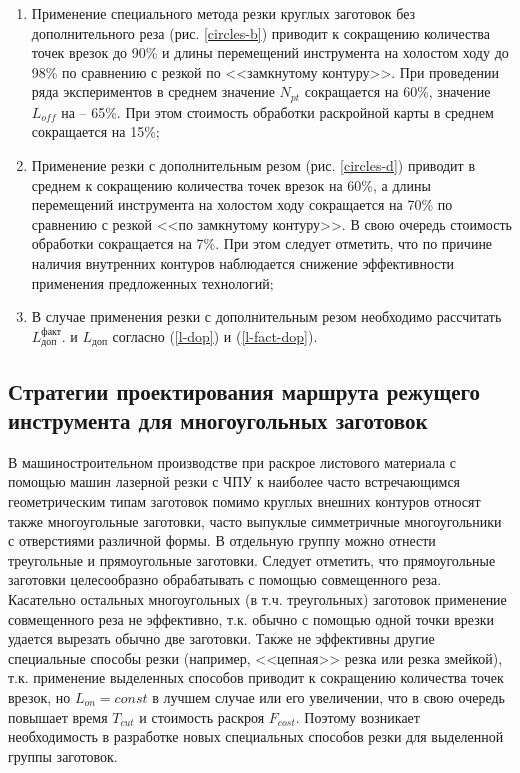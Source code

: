 \documentclass[11pt,twoside]{report}
\begin{document}
\begin{enumerate}
\item Применение специального метода резки круглых заготовок
без дополнительного реза (рис. \ref{circles-b})
приводит к сокращению количества точек врезок до 90\%
 и длины перемещений инструмента на холостом ходу до 98\%
 по сравнению с резкой по <<замкнутому контуру>>.
 При проведении ряда экспериментов в среднем значение $N_{pt}$
 сокращается на 60\%, значение $L_{off}$ на – 65\%.
 При этом стоимость обработки раскройной карты в среднем сокращается на 15\%;

\item Применение резки с дополнительным резом (рис. \ref{circles-d})
приводит в среднем к сокращению количества точек врезок на 60\%,
а длины перемещений инструмента на холостом ходу сокращается на 70\%
по сравнению с резкой <<по замкнутому контуру>>.
В свою очередь стоимость обработки сокращается на 7\%.
При этом следует отметить,
что по причине наличия внутренних контуров
наблюдается снижение эффективности применения
предложенных технологий;

\item В случае применения резки с дополнительным резом необходимо рассчитать
$L_\text{доп}^\text{факт}$.
и
$L_\text{доп}$
согласно (\ref{l-dop}) и (\ref{l-fact-dop}).
\end{enumerate}

\subsection{Стратегии проектирования маршрута режущего инструмента для многоугольных заготовок}

В машиностроительном производстве
при раскрое листового материала с помощью машин лазерной резки с ЧПУ
к наиболее часто встречающимся геометрическим
типам заготовок помимо круглых внешних контуров
относят также многоугольные заготовки,
часто выпуклые симметричные многоугольники с отверстиями различной формы.
В отдельную группу можно отнести треугольные и прямоугольные заготовки.
Следует отметить, что прямоугольные заготовки целесообразно обрабатывать
с помощью совмещенного реза.
Касательно остальных многоугольных (в т.ч. треугольных)
заготовок применение совмещенного реза не эффективно,
т.к. обычно с помощью одной точки врезки удается вырезать обычно две заготовки.
Также не эффективны другие специальные способы резки
(например, <<цепная>> резка или резка змейкой),
т.к. применение выделенных способов приводит к
сокращению количества точек врезок,
но
$L_{on}=const$
в лучшем случае или его увеличении,
что в свою очередь повышает время
$T_{cut}$
и стоимость раскроя
$F_{cost}$.
Поэтому возникает необходимость в разработке
новых специальных способов резки для выделенной группы заготовок.
\end{document}
